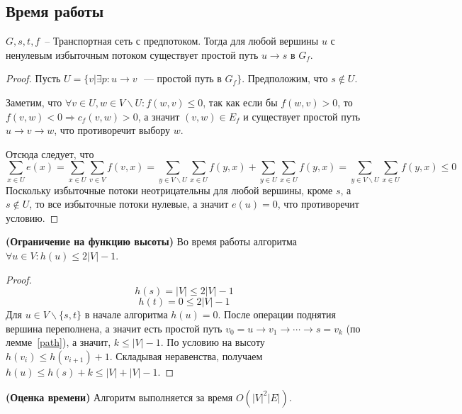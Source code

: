 \subsection{Время работы}
\begin{lemma}\label{path}
	$G,s,t,f$~-- Транспортная сеть с предпотоком. Тогда для любой вершины $u$ с ненулевым избыточным потоком существует простой путь $u\to s$ в $G_f$.
\end{lemma}
\begin{proof}
	Пусть $U=\{v|\exists p\colon u\to v\text{ ~--- простой путь в }G_f\}$. Предположим, что $s\not\in U$.
	
	Заметим, что $\forall v\in U, w\in V\smallsetminus U\colon f(w,v)\le 0$, так как если бы $f(w,v)>0$, то $f(v,w)<0\Rightarrow c_f(v,w)>0$, а значит $(v,w)\in E_f$ и существует простой путь $u\to v\to w$, что противоречит выбору $w$.
	
	Отсюда следует, что
	$$
	\sum_{x\in U}e(x)=\sum_{x\in U}\sum_{v\in V}f(v,x)=\sum_{y\in V\smallsetminus U}\sum_{x\in U}f(y,x)+\sum_{y\in U}\sum_{x\in U}f(y,x)=\sum_{y\in V\smallsetminus U}\sum_{x\in U}f(y,x)\le 0
	$$
	Поскольку избыточные потоки неотрицательны для любой вершины, кроме $s$, а $s\not\in U$, то все избыточные потоки нулевые, а значит $e(u)=0$, что противоречит условию.
\end{proof}
\begin{lemma}{\bf (Ограничение на функцию высоты)}
	Во время работы алгоритма $\forall u\in V\colon h(u)\le 2|V|-1$.
\end{lemma}
\begin{proof}
	$$h(s)=|V|\le 2|V|-1$$
	$$h(t)=0\le 2|V|-1$$
	Для $u\in V\smallsetminus\{s,t\}$ в начале алгоритма $h(u)=0$. После операции поднятия вершина переполнена, а значит есть простой путь $v_0=u\to v_1\to\cdots\to s=v_k$ (по лемме~\ref{path}), а значит, $k\le |V|-1$. По условию на высоту $h(v_i)\le h(v_{i+1})+1$. Складывая неравенства, получаем $h(u)\le h(s)+k\le |V|+|V|-1$.
\end{proof}
\begin{theorem}{\bf (Оценка времени)}
	Алгоритм выполняется за время $O(|V|^2|E|)$.
\end{theorem}
